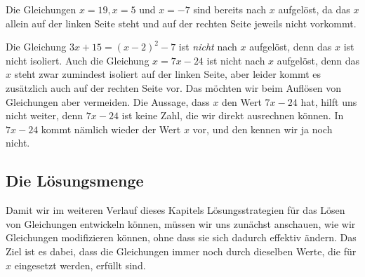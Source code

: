 \documentclass[../../main.tex]{subfiles}
\begin{document}
\begin{example}
    Die Gleichungen $x=19, x=5$ und $x=-7$ sind bereits nach $x$ aufgelöst, da das $x$ allein auf der linken Seite steht und auf der rechten Seite jeweils nicht vorkommt.
\end{example}
\begin{example}
    Die Gleichung $3x+15=(x-2)^2-7$ ist \emph{nicht} nach $x$ aufgelöst, denn das $x$ ist nicht isoliert. Auch die Gleichung $x=7x-24$ ist nicht nach $x$ aufgelöst, denn das $x$ steht zwar zumindest isoliert auf der linken Seite, aber leider kommt es zusätzlich auch auf der rechten Seite vor. Das möchten wir beim Auflösen von Gleichungen aber vermeiden. Die Aussage, dass $x$ den Wert $7x-24$ hat, hilft uns nicht weiter, denn $7x-24$ ist keine Zahl, die wir direkt ausrechnen können. In $7x-24$ kommt nämlich wieder der Wert $x$ vor, und den kennen wir ja noch nicht.
\end{example}

\subsection{Die Lösungsmenge}

Damit wir im weiteren Verlauf dieses Kapitels Lösungsstrategien für das Lösen von Gleichungen entwickeln können, müssen wir uns zunächst anschauen, wie wir Gleichungen modifizieren können, ohne dass sie sich dadurch effektiv ändern. Das Ziel ist es dabei, dass die Gleichungen immer noch durch dieselben Werte, die für $x$ eingesetzt werden, erfüllt sind.
\end{document}
